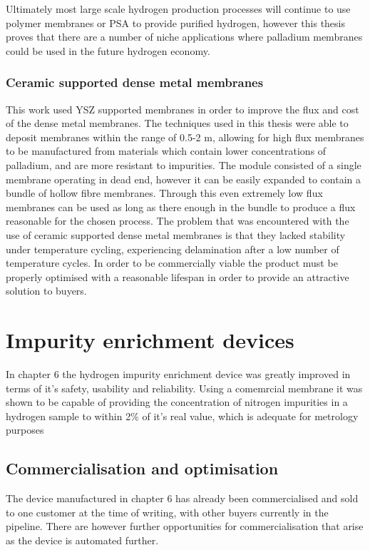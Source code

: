 Ultimately most large scale hydrogen production processes will continue to use polymer membranes or PSA to provide purified hydrogen, however this thesis proves that there are a number of niche applications where palladium membranes could be used in the future hydrogen economy. 

\subsubsection*{Ceramic supported dense metal membranes}
This work used YSZ supported membranes in order to improve the flux and cost of the dense metal membranes. The techniques used in this thesis were able to deposit membranes within the range of 0.5-2 \textmu m, allowing for high flux membranes to be manufactured from materials which contain lower concentrations of palladium, and are more resistant to impurities. The module consisted of a single membrane operating in dead end, however it can be easily expanded to contain a bundle of hollow fibre membranes. Through this even extremely low flux membranes can be used as long as there enough in the bundle to produce a flux reasonable for the chosen process. The problem that was encountered with the use of ceramic supported dense metal membranes is that they lacked stability under temperature cycling, experiencing delamination after a low number of temperature cycles. In order to be commercially viable the product must be properly optimised with a reasonable lifespan in order to provide an attractive solution to buyers. 

\section{Impurity enrichment devices}
In chapter 6 the hydrogen impurity enrichment device was greatly improved in terms of it's safety, usability and reliability. Using a comemrcial membrane it was shown to be capable of providing the concentration of nitrogen impurities in a hydrogen sample to within 2\% of it's real value, which is adequate for metrology purposes \cite{Murugan2015}

\subsection{Commercialisation and optimisation}
The device manufactured in chapter 6 has already been commercialised and sold to one customer at the time of writing, with other buyers currently in the pipeline. There are however further opportunities for commercialisation that arise as the device is automated further. 

